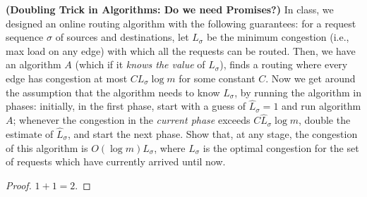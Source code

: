 \documentclass[solution,addpoints,12pt]{exam}
\begin{document}
\begin{questions}


\question[10] \textbf{(Doubling Trick in Algorithms: Do we need Promises?)}  In class, we designed an online routing algorithm with the following guarantees: for a request sequence $\sigma$ of sources and destinations, let $L_\sigma$ be the minimum congestion (i.e., max load on any edge) with which all the requests can be routed. Then, we have an algorithm $A$ (which if it \emph{knows the value} of $L_\sigma$), finds a routing where every edge has congestion at most $C L_\sigma \log m$ for some constant $C$. Now we get around the assumption that the algorithm needs to know $L_\sigma$, by running the algorithm in phases: initially, in the first phase, start with a guess of $\hat{L}_\sigma =1$ and run algorithm $A$; whenever the congestion in the \emph{current phase} exceeds $C \hat{L}_\sigma \log m$, double the estimate of $\hat{L}_\sigma$, and start the next phase. Show that, at any stage, the congestion of this algorithm is $O(\log m) L_\sigma$, where $L_\sigma$ is the optimal congestion for the set of requests which have currently arrived until now.

  \begin{solution}
  \begin{proof}
  $1 + 1 = 2$.
  \end{proof}
  \end{solution}

\end{questions}
\end{document}
